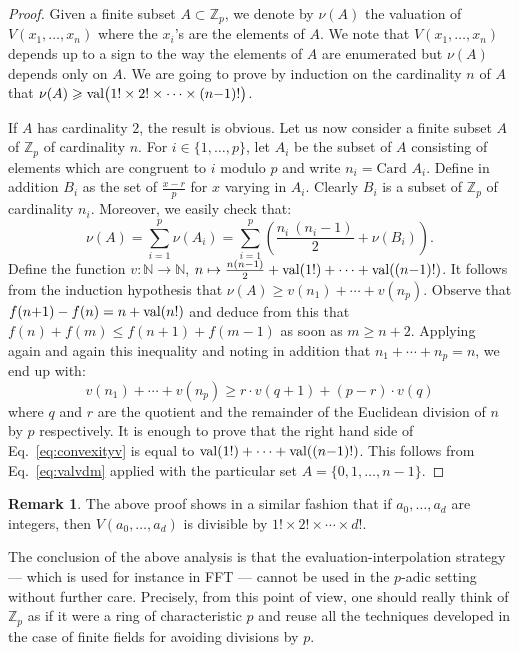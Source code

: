 \documentclass[11pt]{article}
\numberwithin{equation}{section}
\numberwithin{figure}{section}
\renewcommand{\leq}{\leqslant}
\renewcommand{\geq}{\geqslant}
\theoremstyle{definition}
\newtheorem{rem}[theo]{Remark}
\newcommand{\N}{\mathbb N}
\newcommand{\Z}{\mathbb Z}
\newcommand{\Zp}{\Z_p}
\newcommand{\val}{\text{\rm val}}
\begin{document}
\begin{proof}
Given a finite subset $A \subset \Zp$, we denote by $\nu(A)$ the 
valuation of $V(x_1, \ldots, x_n)$ where the $x_i$'s are the elements of 
$A$. We note that $V(x_1, \ldots, x_n)$ depends up to a sign to the way 
the elements of $A$ are enumerated but $\nu(A)$ depends only on $A$. We
are going to prove by induction on the cardinality $n$ of $A$ that
$\nu(A) \geq \val\big(1! \times 2! \times \cdots \times (n{-}1)!\big)$.

If $A$ has cardinality $2$, the result is obvious. Let us now consider 
a finite subset $A$ of $\Zp$ of cardinality $n$. For $i \in \{1, \ldots,
p\}$, let $A_i$ be the subset of $A$ consisting of elements which are
congruent to $i$ modulo $p$ and write $n_i = \text{Card } A_i$. Define
in addition $B_i$ as the set of $\frac{x-r} p$ for $x$ varying in $A_i$.
Clearly $B_i$ is a subset of $\Zp$ of cardinality $n_i$.
Moreover, we easily check that: 
\begin{equation}
\label{eq:valvdm}
\nu(A) = \sum_{i=1}^p \nu(A_i) 
= \sum_{i=1}^p \left(\frac{n_i \: (n_i{-}1)} 2 + \nu(B_i)\right).
\end{equation}
Define the function $v : \N \to \N$,
$n \mapsto \frac{n(n{-}1)} 2 + \val(1!) + \cdots + \val((n{-}1)!)$.
It follows from the induction hypothesis that $\nu(A) \geq v(n_1) + 
\cdots + v(n_p)$. Observe that $f(n{+}1) - f(n) = n + \val(n!)$ and
deduce from this that $f(n) + f(m) \leq f(n{+}1) + f(m{-}1)$ as soon
as $m \geq n+2$. Applying again and again this inequality and noting
in addition that $n_1 + \cdots + n_p = n$, we end up with:
\begin{equation}
\label{eq:convexityv}
v(n_1) + \cdots + v(n_p) \geq r \cdot v(q{+}1) + (p{-}r) \cdot v(q)
\end{equation}
where $q$ and $r$ are the quotient and the remainder of the Euclidean
division of $n$ by $p$ respectively. 
It is enough to prove that the right hand side of 
Eq.~\eqref{eq:convexityv} is equal to $\val(1!) + \cdots + 
\val((n{-}1)!)$. This follows from Eq.~\eqref{eq:valvdm} applied with
the particular set $A = \{0, 1, \ldots, n{-}1\}$.
\end{proof}

\begin{rem}
The above proof shows in a similar fashion 
that if $a_0, \ldots, a_d$ are integers, then $V(a_0, \ldots, a_d)$
is divisible by $1! \times 2! \times \cdots \times d!$.
\end{rem}

The conclusion of the above analysis is that the 
evaluation-interpolation strategy --- which is used for instance in FFT 
--- cannot be used in the $p$-adic setting without further care. 
Precisely, from this point of view, one should really think of $\Zp$ as 
if it were a ring of characteristic $p$ and reuse all the techniques 
developed in the case of finite fields for avoiding divisions by $p$.
\end{document}
